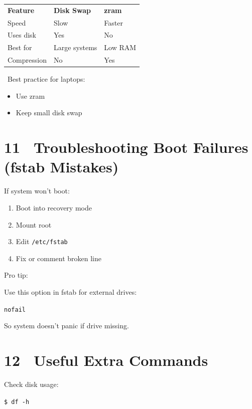 \documentclass[12pt]{article}
\begin{document}
\begin{infobox}
\begin{tabular}{lll}
\textbf{Feature} & \textbf{Disk Swap} & \textbf{zram} \\
Speed & Slow & Faster \\
Uses disk & Yes & No \\
Best for & Large systems & Low RAM \\
Compression & No & Yes \\
\end{tabular}
\end{infobox}

\begin{infobox}
\faLightbulb\ Best practice for laptops:
\begin{itemize}
    \item Use zram
    \item Keep small disk swap
\end{itemize}
\end{infobox}

\section*{11 \faTools\ Troubleshooting Boot Failures (fstab Mistakes)}

If system won't boot:

\begin{enumerate}
    \item Boot into recovery mode
    \item Mount root
    \item Edit \texttt{/etc/fstab}
    \item Fix or comment broken line
\end{enumerate}

Pro tip:

Use this option in fstab for external drives:

\begin{highlightbox}
\texttt{nofail}
\end{highlightbox}

So system doesn't panic if drive missing.

\section*{12 \faList\ Useful Extra Commands}

Check disk usage:

\begin{highlightbox}
\texttt{\$ df -h}
\end{highlightbox}
\end{document}
